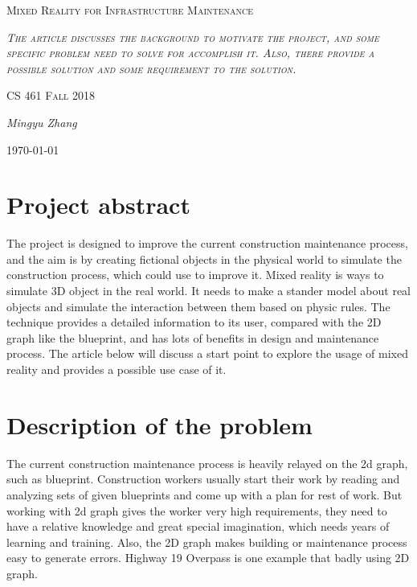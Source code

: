 \documentclass[10pt,letter paper]{article}
\begin{document}
\begin{titlepage}
	\centering
	\vspace{8cm}
	{\scshape\huge Mixed Reality for Infrastructure Maintenance \par}
	\vspace{2cm}
	{\scshape\itshape The article discusses the background to motivate the project, and some specific problem need to solve for accomplish it. Also, there provide a possible solution and some requirement to the solution.
\par}
	\vspace{1.5cm}
	{\scshape\Large CS 461 Fall 2018\par}
	\vspace{1.5cm}
	{\Large\itshape Mingyu Zhang\par}
	\vspace{1.5cm}


	{\large \today\par}
\end{titlepage}
\section*{Project abstract }\bigskip
	The project is designed to improve the current construction maintenance process, and the aim is by creating fictional objects in the physical world to simulate the construction process, which could use to improve it. Mixed reality is ways to simulate 3D object in the real world. It needs to make a stander model about real objects and simulate the interaction between them based on physic rules. The technique provides a detailed information to its user, compared with the 2D graph like the blueprint, and has lots of benefits in design and maintenance process. The article below will discuss a start point to explore the usage of mixed reality and provides a possible use case of it.

\section*{Description of the problem}
    \bigskip
    The current construction maintenance process is heavily relayed on the 2d graph, such as blueprint. Construction workers usually start their work by reading and analyzing sets of given blueprints and come up with a plan for rest of work. But working with 2d graph gives the worker very high requirements, they need to have a relative knowledge and great special imagination, which needs years of learning and training. Also, the 2D graph makes building or maintenance process easy to generate errors. Highway 19 Overpass is one example that badly using 2D graph. \newline \par
\end{document}
